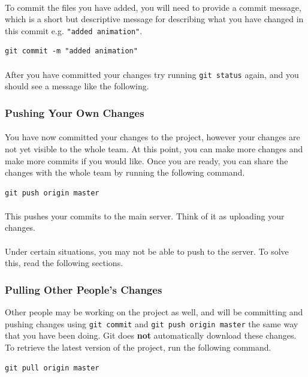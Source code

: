 \documentclass[11pt]{article}
\begin{document}
\paragraph{}
To commit the files you have added, you will need to provide a commit message, which is a short but descriptive message for describing what you have changed in this commit e.g. \lstinline{"added animation"}.
\begin{lstlisting}
git commit -m "added animation"
\end{lstlisting}
\paragraph{}
After you have committed your changes try running \lstinline{git status} again, and you should see a message like the following.

\subsubsection{Pushing Your Own Changes}
\paragraph{}
You have now committed your changes to the project, however your changes are not yet visible to the whole team. At this point, you can make more changes and make more commits if you would like. Once you are ready, you can share the changes with the whole team by running the following command.
\begin{lstlisting}
git push origin master
\end{lstlisting}
\paragraph{}
This pushes your commits to the main server. Think of it as uploading your changes.
\paragraph{}
Under certain situations, you may not be able to push to the server. To solve this, read the following sections.
\subsubsection{Pulling Other People's Changes}
Other people may be working on the project as well, and will be committing and pushing changes using \lstinline{git commit} and \lstinline{git push origin master} the same way that you have been doing. Git does \textbf{not} automatically download these changes. To retrieve the latest version of the project, run the following command.
\begin{lstlisting}
git pull origin master
\end{lstlisting}
\end{document}
